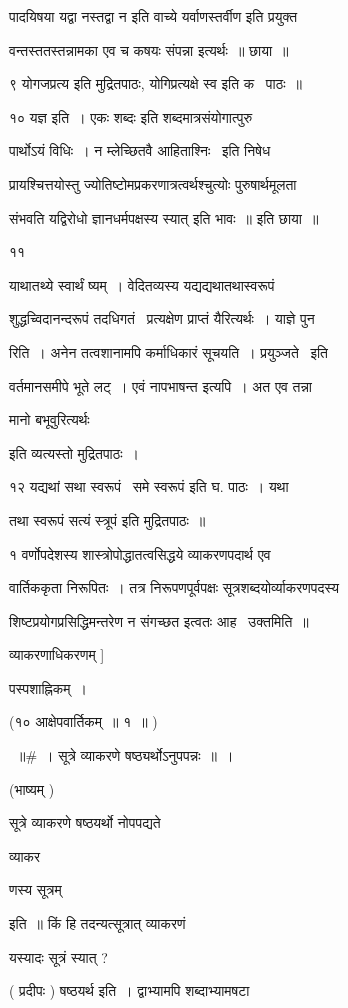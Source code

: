 \documentclass[11pt, openany]{book}
\begin{document}
पादयिषया {\qt यद्वा नस्तद्वा न} इति वाच्ये {\qt यर्वाणस्तर्वीण इति प्रयुक्त} \textendash\ 

वन्तस्ततस्तन्नामका एव च कषयः संपन्ना इत्यर्थः~॥ छाया~॥ 

९ {\qt योगजप्रत्य इति मुद्रितपाठः,} योगिप्रत्यक्षे स्व इति क \textendash\ पाठः~॥ 

१० यज्ञ इति~। {\qt एकः शब्दः} इति शब्दमात्रसंयोगात्पुरु \textendash\ 

पार्थोऽयं विधिः~। {\qt न म्लेच्छितवै} आहिताश्निः \textendash\  इति निषेध \textendash\ 

प्रायश्चित्तयोस्तु ज्योतिष्टोमप्रकरणात्रत्वर्थश्चुत्योः पुरुषार्थमूलता


संभवति यद्विरोधो ज्ञानधर्मपक्षस्य स्यात् इति भावः~॥ इति छाया~॥ 

११ {\qt याथातथ्ये स्वार्थं ष्यम्~। वेदितव्यस्य यद्यद्यथातथास्वरूपं 

शुद्धच्विदानन्दरूपं तदधिगतं \textendash\ प्रत्यक्षेण प्राप्तं यैरित्यर्थः~। याज्ञे
पुन \textendash\ 

रिति~। अनेन तत्वशानामपि कर्माधिकारं सूचयति~। प्रयुञ्जते \textendash\ इति 

वर्तमानसमीपे भूते लट्~। एवं नापभाषन्त इत्यपि~। अत एव तन्ना \textendash\ 

मानो बभूवुरित्यर्थः} इति व्यत्यस्तो मुद्रितपाठः~। 

१२ {\qt यद्यथां सथा स्वरूपं} \textendash\ समे स्वरूपं इति घ. पाठः~। यथा 

तथा स्वरूपं सत्यं स्त्रूपं इति मुद्रितपाठः~॥ 

१ वर्णोपदेशस्य शास्त्रोपोद्धातत्वसिद्धये व्याकरणपदार्थ एव 

वार्तिककृता निरूपितः~। तत्र निरूपणपूर्वपक्षः सूत्रशब्दयोर्व्याकरणपदस्य 

शिष्टप्रयोगप्रसिद्धिमन्तरेण न संगच्छत इत्वतः आह \textendash\ उक्तमिति~॥ 

व्याकरणाधिकरणम् ] 

पस्पशाह्निकम्~। 



(१० आक्षेपवार्तिकम्~॥ १~॥ ) 

~॥\#~। सूत्रे व्याकरणे षष्ठ्यर्थोऽनुपपन्नः~॥~। 

(भाष्यम् ) 

सूत्रे व्याकरणे षष्ठयर्थो नोपपद्यते \textendash\ {\qt व्याकर \textendash\ 

णस्य सूत्रम्} इति~॥ किं हि तदन्यत्सूत्रात् व्याकरणं 

यस्यादः सूत्रं स्यात् ? 

( प्रदीपः ) षष्ठयर्थ इति~। द्वाभ्यामपि शब्दाभ्यामषटा \textendash\ 
\end{document}

